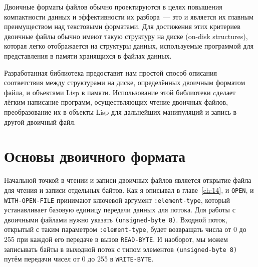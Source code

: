 Двоичные форматы файлов обычно проектируются в целях повышения компактности данных и
эффективности их разбора~--- это и является их главным преимуществом над текстовыми
форматами. Для достижения этих критериев двоичные файлы обычно имеют такую структуру на
диске (on-disk structures), которая легко отображается на структуры данных, используемые
программой для представления в памяти хранящихся в файлах данных.

Разработанная библиотека предоставит нам простой способ описания соответствия между
структурами на диске, определённых двоичным форматом файла, и объектами Lisp в
памяти. Использование этой библиотеки cделает лёгким написание программ, осуществляющих
чтение двоичных файлов, преобразование их в объекты Lisp для дальнейших манипуляций и
запись в другой двоичный файл.

\section{Основы двоичного формата}

Начальной точкой в чтении и записи двоичных файлов является открытие файла для чтения и
записи отдельных байтов. Как я описывал в главе~\ref{ch:14}, и \lstinline{OPEN}, и
\lstinline{WITH-OPEN-FILE} принимают ключевой аргумент \lstinline{:element-type}, который
устанавливает базовую единицу передачи данных для потока. Для работы с двоичными файлами
нужно указать \lstinline{(unsigned-byte 8)}. Входной поток, открытый с таким параметром
\lstinline{:element-type}, будет возвращать числа от 0 до 255 при каждой его передаче в вызов
\lstinline{READ-BYTE}. И наоборот, мы можем записывать байты в выходной поток с типом
элементов \lstinline{(unsigned-byte 8)} путём передачи чисел от 0 до 255 в \lstinline{WRITE-BYTE}.

